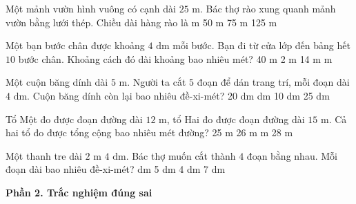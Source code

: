 \begin{ex} %
Một mảnh vườn hình vuông có cạnh dài $25\text{ m}$. Bác thợ rào xung quanh mảnh vườn bằng lưới thép. Chiều dài hàng rào là
\choice
{ m}
{50 m}
{75 m}
{125 m}
\end{ex}

\begin{ex} %
Một bạn bước chân được khoảng $4\text{ dm}$ mỗi bước. Bạn đi từ cửa lớp đến bảng hết $10$ bước chân. Khoảng cách đó dài khoảng bao nhiêu mét?
\choice
{40 m}
{2 m}
{14 m}
{ m}
\end{ex}

\begin{ex} %
Một cuộn băng dính dài $5\text{ m}$. Người ta cắt $5$ đoạn để dán trang trí, mỗi đoạn dài $4\text{ dm}$. Cuộn băng dính còn lại bao nhiêu đề-xi-mét?
\choice
{20 dm}
{ dm}
{10 dm}
{25 dm}
\end{ex}

\begin{ex} %
Tổ Một đo được đoạn đường dài $12\text{ m}$, tổ Hai đo được đoạn đường dài $15\text{ m}$. Cả hai tổ đo được tổng cộng bao nhiêu mét đường?
\choice
{25 m}
{26 m}
{ m}
{28 m}
\end{ex}

\begin{ex} %
Một thanh tre dài $2\text{ m } 4\text{ dm}$. Bác thợ muốn cắt thành $4$ đoạn bằng nhau. Mỗi đoạn dài bao nhiêu đề-xi-mét?
\choice
{ dm}
{5 dm}
{4 dm}
{7 dm}
\end{ex}

\textbf{Phần 2. Trắc nghiệm đúng sai}

